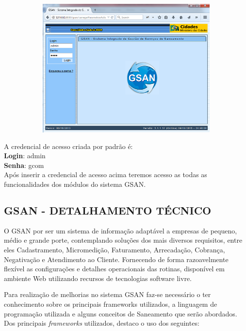 \begin{figure}[H]
	\centering
	\caption{Acessando página inicial do Sistema}
	\label{figura:acessoPaginaInicial}
	\begin{subfigure}[H]{\textwidth}
		\centering
	\includegraphics{figuras/gsan_online.png}	
	\end{subfigure}
\end{figure}	


A credencial de acesso criada por padrão é: \\
\textbf{Login}: admin \\
\textbf{Senha}: gcom \\
Após inserir a credencial de acesso acima teremos acesso as todas as funcionalidades dos módulos do sistema GSAN.


\subsection{\textbf{GSAN - DETALHAMENTO TÉCNICO}}

O GSAN por ser um sistema de informação adaptável a empresas de pequeno, médio e grande porte, contemplando soluções dos mais diversos requisitos, entre eles Cadastramento, Micromedição, Faturamento, Arrecadação, Cobrança, Negativação e Atendimento ao Cliente. Fornecendo de forma razoavelmente flexível as configurações e detalhes operacionais das rotinas, disponível em ambiente Web utilizando recursos de tecnologias software livre.

Para realização de melhorias no sistema GSAN faz-se necessário o ter conhecimento sobre os principais frameworks utilizados, a linguagem de programação utilizada e alguns conceitos de Saneamento que serão abordados.
Dos principais \textit{frameworks} utilizados, destaco o uso dos seguintes: \\

